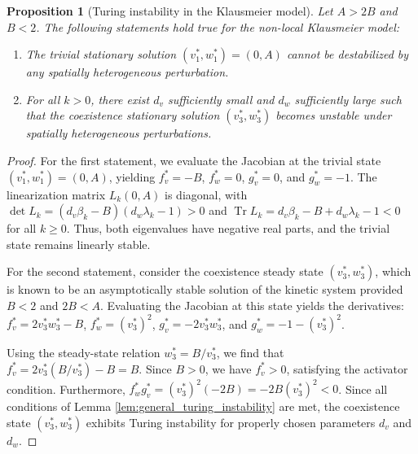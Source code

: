 \documentclass[11pt, a4paper]{article}
\theoremstyle{break}
\theoremstyle{break}
\newtheorem{prp}{Proposition}[section]
\theoremstyle{break}
\theoremstyle{break}
\theoremstyle{break}
\theoremstyle{break}
\theoremstyle{break}
\theoremstyle{break}
\theoremstyle{break}
\theoremstyle{break}
\DeclareMathOperator{\Tr}{Tr}
\begin{document}
\begin{prp}[Turing instability in the Klausmeier model]
    \label{prp:klausmeier_instability}
    Let $A > 2B$ and $B < 2$. The following statements hold true for the non-local Klausmeier model:
    \begin{enumerate}
        \item The trivial stationary solution $(v_1^*, w_1^*) = (0, A)$ cannot be destabilized by any spatially heterogeneous perturbation.
        \item For all $k > 0$, there exist $d_v$ sufficiently small and $d_w$ sufficiently large such that the coexistence stationary solution $(v_3^*, w_3^*)$ becomes unstable under spatially heterogeneous perturbations.
    \end{enumerate}
\end{prp}

\begin{proof}
    For the first statement, we evaluate the Jacobian at the trivial state $(v_1^*, w_1^*) = (0, A)$, yielding $f_v^* = -B$, $f_w^* = 0$, $g_v^* = 0$, and $g_w^* = -1$. The linearization matrix $L_k(0, A)$ is diagonal, with $\det L_k = (d_v \beta_k - B)(d_w \lambda_k - 1) > 0$ and $\Tr L_k = d_v \beta_k - B + d_w \lambda_k - 1 < 0$ for all $k \geq 0$. Thus, both eigenvalues have negative real parts, and the trivial state remains linearly stable.
    
    For the second statement, consider the coexistence steady state $(v_3^*, w_3^*)$, which is known to be an asymptotically stable solution of the kinetic system provided $B < 2$ and $2B < A$. Evaluating the Jacobian at this state yields the derivatives: $f_v^* = 2v_3^* w_3^* - B$, $f_w^* = (v_3^*)^2$, $g_v^* = -2v_3^* w_3^*$, and $g_w^* = -1 - (v_3^*)^2$.
    
    Using the steady-state relation $w_3^* = B/v_3^*$, we find that $f_v^* = 2v_3^*(B/v_3^*) - B = B$. Since $B > 0$, we have $f_v^* > 0$, satisfying the activator condition. Furthermore, $f_w^* g_v^* = (v_3^*)^2 (-2B) = -2B(v_3^*)^2 < 0$. Since all conditions of Lemma \ref{lem:general_turing_instability} are met, the coexistence state $(v_3^*, w_3^*)$ exhibits Turing instability for properly chosen parameters $d_v$ and $d_w$.
\end{proof}



\end{document}

